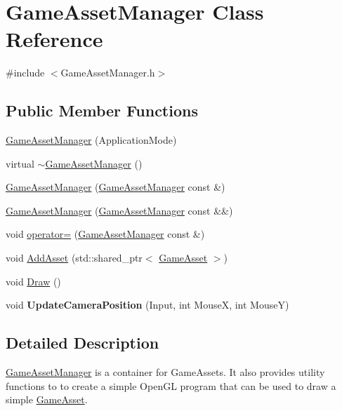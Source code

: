 \hypertarget{classGameAssetManager}{}\section{Game\+Asset\+Manager Class Reference}
\label{classGameAssetManager}


{\ttfamily \#include $<$Game\+Asset\+Manager.\+h$>$}

\subsection*{Public Member Functions}
\begin{DoxyCompactItemize}
\item 
\hyperlink{classGameAssetManager_aaa0d58e276cc10ad91a7457085598a71}{Game\+Asset\+Manager} (Application\+Mode)
\item 
virtual \hyperlink{classGameAssetManager_a1270bd61ecbcca563f079803e40c9b77}{$\sim$\+Game\+Asset\+Manager} ()
\item 
\hyperlink{classGameAssetManager_a2c9adcb72faa154c87eadc9bafe5269d}{Game\+Asset\+Manager} (\hyperlink{classGameAssetManager}{Game\+Asset\+Manager} const \&)
\item 
\hyperlink{classGameAssetManager_a44f6e2fd6b8ff1dd64e5697f1be7386d}{Game\+Asset\+Manager} (\hyperlink{classGameAssetManager}{Game\+Asset\+Manager} const \&\&)
\item 
void \hyperlink{classGameAssetManager_ac72678a4ad5378c685aa6bae84a4e712}{operator=} (\hyperlink{classGameAssetManager}{Game\+Asset\+Manager} const \&)
\item 
void \hyperlink{classGameAssetManager_ad3de8ff00d55ba04728b1de8213b2349}{Add\+Asset} (std\+::shared\+\_\+ptr$<$ \hyperlink{classGameAsset}{Game\+Asset} $>$)
\item 
void \hyperlink{classGameAssetManager_a32837132bd70a9a9ed537323c2d3d886}{Draw} ()
\item 
\hypertarget{classGameAssetManager_a9482a4f13e9004c0860eb3e015934b88}{}void {\bfseries Update\+Camera\+Position} (Input, int Mouse\+X, int Mouse\+Y)\label{classGameAssetManager_a9482a4f13e9004c0860eb3e015934b88}

\end{DoxyCompactItemize}


\subsection{Detailed Description}
\hyperlink{classGameAssetManager}{Game\+Asset\+Manager} is a container for Game\+Assets. It also provides utility functions to to create a simple Open\+G\+L program that can be used to draw a simple \hyperlink{classGameAsset}{Game\+Asset}. 

